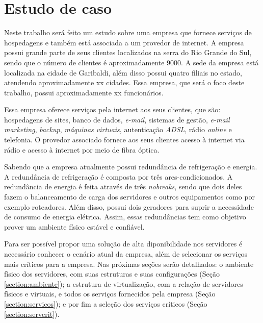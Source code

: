 \chapter{Estudo de caso}
\label{cap:estudodecaso}

Neste trabalho será feito um estudo sobre uma empresa que fornece serviços de hospedagens e também está associada a um 
provedor de internet\footnotemark[1]. 
A empresa possui grande parte de seus clientes localizados na serra do Rio Grande do Sul, sendo que o número de clientes é aproximadamente 9000. 
A sede da empresa está localizada na cidade de Garibaldi, além disso possui quatro filiais no estado, atendendo aproximadamente xx cidades.
Essa empresa, que será o foco deste trabalho, possui aproximadamente xx funcionários.


Essa empresa oferece serviços pela internet aos seus clientes, que são: hospedagens de sites, banco de dados, \textit{e-mail}, sistemas de gestão, 
\textit{e-mail marketing}, \textit{backup}, \textit{máquinas virtuais}, autenticação \textit{ADSL}, rádio \textit{online} e telefonia.
O provedor associado fornece aos seus clientes acesso à internet via rádio e acesso à internet por meio de fibra óptica.

Sabendo que a empresa atualmente possui redundância de refrigeração e energia. A redundância de refrigeração é composta por três ares-condicionados. 
A redundância de energia é feita através de três \textit{nobreaks}, sendo que dois deles fazem o balanceamento de carga dos servidores e outros 
equipamentos como por exemplo roteadores. Além disso, possui dois geradores para suprir a necessidade de consumo de energia elétrica. 
Assim, essas redundâncias tem como objetivo prover um ambiente físico estável e confiável.

Para ser possível propor uma solução de alta diponibilidade nos servidores é necessário conhecer o cenário atual da empresa, além de selecionar 
os serviços mais críticos para a empresa. Nas próximas seções serão detalhados: o ambiente físico dos servidores, com suas estruturas e suas 
configurações (Seção \ref{section:ambiente}); a estrutura de virtualização, com a relação de servidores físicos e virtuais, e todos os 
serviços fornecidos pela empresa (Seção \ref{section:servicos}); e por fim a seleção dos serviços críticos (Seção \ref{section:servcrit}).


